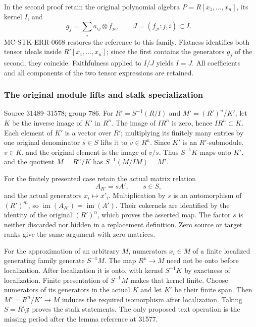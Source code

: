 In the second proof retain the original polynomial algebra \(P=R[x_1,\ldots,x_n]\), its kernel \(I\), and \[
g_j=\sum_i a_{ij}\otimes f_{ji},\qquad
J=(f_{ji}:j,i)\subset I.
\] MC-\AlgebraIdentifierBreak{}STK-\AlgebraIdentifierBreak{}ERR-\AlgebraIdentifierBreak{}0668 restores the reference to this family. Flatness identifies both tensor ideals inside \(R'[x_1,\ldots,x_n]\); since the first contains the generators \(g_j\) of the second, they coincide. Faithfulness applied to \(I/J\) yields \(I=J\). All coefficients and all components of the two tensor expressions are retained.

\subsubsection{The original module lifts and stalk specialization}\label{algebra-proof-035-the-original-module-lifts-and-stalk-specialization}

Source 31489--31578; group 786. For \(R'=S^{-1}(R/I)\) and \(M'=(R')^n/K'\), let \(K\) be the inverse image of \(K'\) in \(R^n\). The image of \(I R^n\) is zero, hence \(IR^n\subset K\). Each element of \(K'\) is a vector over \(R'\); multiplying its finitely many entries by one original denominator \(s\in S\) lifts it to \(v\in R^n\). Since \(K'\) is an \(R'\)-submodule, \(v\in K\), and the original element is the image of \(v/s\). Thus \(S^{-1}K\) maps onto \(K'\), and the quotient \(M=R^n/K\) has \(S^{-1}(M/IM)=M'\).

For the finitely presented case retain the actual matrix relation \[
A_{R'}=sA',\qquad s\in S,
\] and the actual generators \(x_i\mapsto x'_i\). Multiplication by \(s\) is an automorphism of \((R')^m\), so \(\operatorname{im}(A_{R'})=\operatorname{im}(A')\). Their cokernels are identified by the identity of the original \((R')^n\), which proves the asserted map. The factor \(s\) is neither discarded nor hidden in a replacement definition. Zero source or target ranks give the same argument with zero matrices.

For the approximation of an arbitrary \(M\), numerators \(x_i\in M\) of a finite localized generating family generate \(S^{-1}M\). The map \(R^n\to M\) need not be onto before localization. After localization it is onto, with kernel \(S^{-1}K\) by exactness of localization. Finite presentation of \(S^{-1}M\) makes that kernel finite. Choose numerators of its generators in the actual \(K\) and let \(K'\) be their finite span. Then \(M'=R^n/K'\to M\) induces the required isomorphism after localization. Taking \(S=R\setminus\mathfrak p\) proves the stalk statements. The only proposed text operation is the missing period after the lemma reference at 31577.

